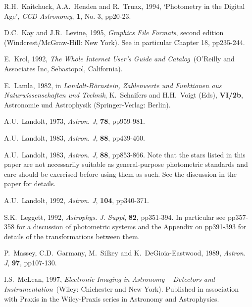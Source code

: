 \documentclass[twoside,11pt]{article}
\begin{document}
\begin{thebibliography}{99}
   R.H.~Kaitchuck, A.A.~Henden and R.~Truax,
   1994, `Photometry in the Digital Age', {\it CCD Astronomy}, {\bf 1},
   No. 3, pp20-23.

   D.C.~Kay and J.R.~Levine, 1995, {\it Graphics File
   Formats}, second edition
  \newline (Windcrest/McGraw-Hill: New York).  See in particular
   Chapter 18, pp235-244.

   E.~Krol, 1992, {\it The Whole Internet User's Guide
   and Catalog}\, (O'Reilly and Associates Inc, Sebastopol, California).

   E.~Lamla, 1982, in {\it Landolt-B\"{o}rnstein,
   Zahlenwerte und Funktionen aus Naturwissenschaften und Technik},
   K.~Schaifers and H.H.~Voigt (Eds), {\bf VI/2b}, Astronomie und
   Astrophysik (Springer-Verlag: Berlin).

   A.U.~Landolt, 1973, {\it Astron. J}, {\bf 78},
   pp959-981.

   A.U.~Landolt, 1983, {\it Astron. J}, {\bf 88},
   pp439-460.

   A.U.~Landolt, 1983, {\it Astron. J}, {\bf 88},
   pp853-866.  Note that the stars listed in this paper are not
   necessarily suitable as general-purpose photometric standards and
   care  should be exercised before using them as such.  See the
   discussion in the paper for details.

   A.U.~Landolt, 1992, {\it Astron. J}, {\bf 104},
   pp340-371.

   S.K.~Leggett, 1992, {\it Astrophys. J. Suppl}, {\bf
   82}, pp351-394.  In particular see pp357-358 for a discussion of
   photometric systems and the Appendix on pp391-393 for details of the
   transformations between them.

   P.~Massey, C.D.~Garmany, M.~Silkey and 
   K.~DeGioia-Eastwood, 1989, {\it Astron. J}, {\bf 97}, pp107-130.

   I.S.~McLean, 1997, {\it Electronic Imaging in
   Astronomy -- Detectors and Instrumentation}\, (Wiley: Chichester and
   New York).  Published in association with Praxis in the Wiley-Praxis
   series in Astronomy and Astrophysics.


\end{thebibliography}
\end{document}
